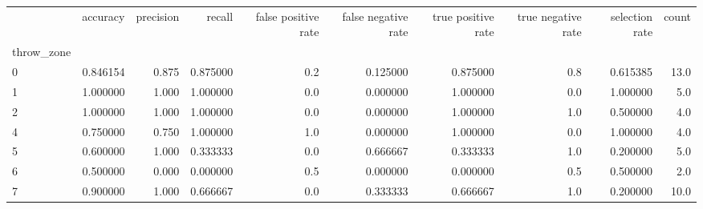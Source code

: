 \begin{tabular}{lrrrrrrrrr}
\toprule
{} &  accuracy &  precision &    recall &  false positive rate &  false negative rate &  true positive rate &  true negative rate &  selection rate &  count \\
throw\_zone &           &            &           &                      &                      &                     &                     &                 &        \\
\midrule
0          &  0.846154 &      0.875 &  0.875000 &                  0.2 &             0.125000 &            0.875000 &                 0.8 &        0.615385 &   13.0 \\
1          &  1.000000 &      1.000 &  1.000000 &                  0.0 &             0.000000 &            1.000000 &                 0.0 &        1.000000 &    5.0 \\
2          &  1.000000 &      1.000 &  1.000000 &                  0.0 &             0.000000 &            1.000000 &                 1.0 &        0.500000 &    4.0 \\
4          &  0.750000 &      0.750 &  1.000000 &                  1.0 &             0.000000 &            1.000000 &                 0.0 &        1.000000 &    4.0 \\
5          &  0.600000 &      1.000 &  0.333333 &                  0.0 &             0.666667 &            0.333333 &                 1.0 &        0.200000 &    5.0 \\
6          &  0.500000 &      0.000 &  0.000000 &                  0.5 &             0.000000 &            0.000000 &                 0.5 &        0.500000 &    2.0 \\
7          &  0.900000 &      1.000 &  0.666667 &                  0.0 &             0.333333 &            0.666667 &                 1.0 &        0.200000 &   10.0 \\
\bottomrule
\end{tabular}
